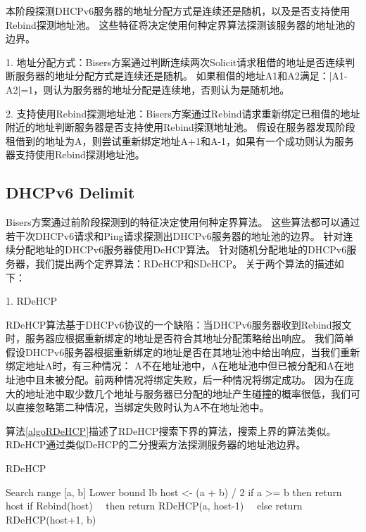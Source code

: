 \documentclass[UTF8]{article}
\begin{document}
本阶段探测DHCPv6服务器的地址分配方式是连续还是随机，以及是否支持使用Rebind探测地址池。
这些特征将决定使用何种定界算法探测该服务器的地址池的边界。

1. 地址分配方式：Bisers方案通过判断连续两次Solicit请求租借的地址是否连续判断服务器的地址分配方式是连续还是随机。
如果租借的地址A1和A2满足：|A1-A2|=1，则认为服务器的地址分配是连续地，否则认为是随机地。

2. 支持使用Rebind探测地址池：Bisers方案通过Rebind请求重新绑定已租借的地址附近的地址判断服务器是否支持使用Rebind探测地址池。
假设在服务器发现阶段租借到的地址为A，则尝试重新绑定地址A+1和A-1，如果有一个成功则认为服务器支持使用Rebind探测地址池。

\subsection{DHCPv6 Delimit}

Bisers方案通过前阶段探测到的特征决定使用何种定界算法。
这些算法都可以通过若干次DHCPv6请求和Ping请求探测出DHCPv6服务器的地址池的边界。
针对连续分配地址的DHCPv6服务器使用DeHCP算法。
针对随机分配地址的DHCPv6服务器，我们提出两个定界算法：RDeHCP和SDeHCP。
关于两个算法的描述如下：

1. RDeHCP

RDeHCP算法基于DHCPv6协议的一个缺陷：当DHCPv6服务器收到Rebind报文时，服务器应根据重新绑定的地址是否符合其地址分配策略给出响应。
我们简单假设DHCPv6服务器根据重新绑定的地址是否在其地址池中给出响应，当我们重新绑定地址A时，有三种情况：
A不在地址池中，A在地址池中但已被分配和A在地址池中且未被分配。前两种情况将绑定失败，后一种情况将绑定成功。
因为在庞大的地址池中取少数几个地址与服务器已分配的地址产生碰撞的概率很低，我们可以直接忽略第二种情况，当绑定失败时认为A不在地址池中。

算法\ref{algoRDeHCP}描述了RDeHCP搜索下界的算法，搜索上界的算法类似。
RDeHCP通过类似DeHCP的二分搜索方法探测服务器的地址池边界。

\begin{algorithm}[H]
  \caption{RDeHCP}
  \label{algoRDeHCP}
  \renewcommand{\algorithmicrequire}{\textbf{Input:}}
  \renewcommand{\algorithmicensure}{\textbf{Output:}}
  \begin{algorithmic}[1]
    \REQUIRE Search range [a, b]
    \ENSURE Lower bound lb
    \STATE host <- (a + b) / 2
    \STATE if a >= b then return host
    \STATE if Rebind(host)
    \STATE \ \ then return RDeHCP(a, host-1)
    \STATE \ \ else return RDeHCP(host+1, b)
  \end{algorithmic}
\end{algorithm}
\end{document}
